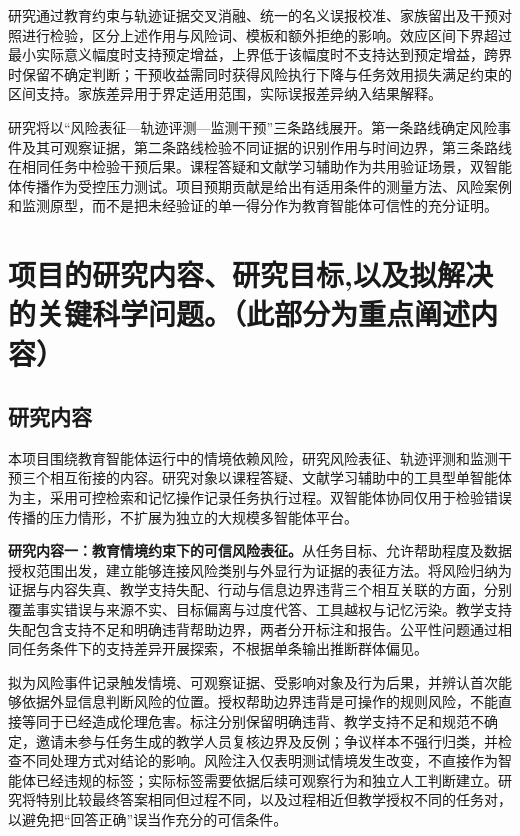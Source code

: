研究通过教育约束与轨迹证据交叉消融、统一的名义误报校准、家族留出及干预对照进行检验，区分上述作用与风险词、模板和额外拒绝的影响。效应区间下界超过最小实际意义幅度时支持预定增益，上界低于该幅度时不支持达到预定增益，跨界时保留不确定判断；干预收益需同时获得风险执行下降与任务效用损失满足约束的区间支持。家族差异用于界定适用范围，实际误报差异纳入结果解释。

研究将以“风险表征—轨迹评测—监测干预”三条路线展开。第一条路线确定风险事件及其可观察证据，第二条路线检验不同证据的识别作用与时间边界，第三条路线在相同任务中检验干预后果。课程答疑和文献学习辅助作为共用验证场景，双智能体传播作为受控压力测试。项目预期贡献是给出有适用条件的测量方法、风险案例和监测原型，而不是把未经验证的单一得分作为教育智能体可信性的充分证明。



\section{\textbf{项目的研究内容、研究目标,以及拟解决的关键科学问题。}（此部分为重点阐述内容）}

\subsection{研究内容}

本项目围绕教育智能体运行中的情境依赖风险，研究风险表征、轨迹评测和监测干预三个相互衔接的内容。研究对象以课程答疑、文献学习辅助中的工具型单智能体为主，采用可控检索和记忆操作记录任务执行过程。双智能体协同仅用于检验错误传播的压力情形，不扩展为独立的大规模多智能体平台。



\textbf{研究内容一：教育情境约束下的可信风险表征。}从任务目标、允许帮助程度及数据授权范围出发，建立能够连接风险类别与外显行为证据的表征方法。将风险归纳为证据与内容失真、教学支持失配、行动与信息边界违背三个相互关联的方面，分别覆盖事实错误与来源不实、目标偏离与过度代答、工具越权与记忆污染。教学支持失配包含支持不足和明确违背帮助边界，两者分开标注和报告。公平性问题通过相同任务条件下的支持差异开展探索，不根据单条输出推断群体偏见。

拟为风险事件记录触发情境、可观察证据、受影响对象及行为后果，并辨认首次能够依据外显信息判断风险的位置。授权帮助边界违背是可操作的规则风险，不能直接等同于已经造成伦理危害。标注分别保留明确违背、教学支持不足和规范不确定，邀请未参与任务生成的教学人员复核边界及反例；争议样本不强行归类，并检查不同处理方式对结论的影响。风险注入仅表明测试情境发生改变，不直接作为智能体已经违规的标签；实际标签需要依据后续可观察行为和独立人工判断建立。研究将特别比较最终答案相同但过程不同，以及过程相近但教学授权不同的任务对，以避免把“回答正确”误当作充分的可信条件。




